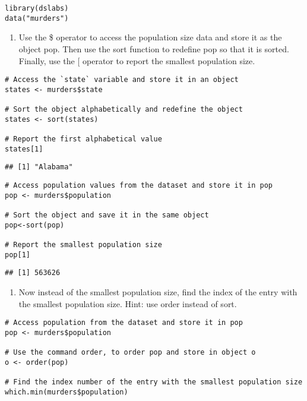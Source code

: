 \documentclass[
]{article}
\providecommand{\tightlist}{%
  \setlength{\itemsep}{0pt}\setlength{\parskip}{0pt}}
\begin{document}
\begin{verbatim}
library(dslabs)
data("murders")
\end{verbatim}

\begin{enumerate}
\def\labelenumi{\arabic{enumi}.}
\tightlist
\item
  Use the \$ operator to access the population size data and store it as
  the object pop. Then use the sort function to redefine pop so that it
  is sorted. Finally, use the {[} operator to report the smallest
  population size.
\end{enumerate}

\begin{verbatim}
# Access the `state` variable and store it in an object 
states <- murders$state 

# Sort the object alphabetically and redefine the object 
states <- sort(states) 

# Report the first alphabetical value  
states[1]
\end{verbatim}

\begin{verbatim}
## [1] "Alabama"
\end{verbatim}

\begin{verbatim}
# Access population values from the dataset and store it in pop
pop <- murders$population

# Sort the object and save it in the same object 
pop<-sort(pop)

# Report the smallest population size 
pop[1]
\end{verbatim}

\begin{verbatim}
## [1] 563626
\end{verbatim}

\begin{enumerate}
\def\labelenumi{\arabic{enumi}.}
\setcounter{enumi}{1}
\tightlist
\item
  Now instead of the smallest population size, find the index of the
  entry with the smallest population size. Hint: use order instead of
  sort.
\end{enumerate}

\begin{verbatim}
# Access population from the dataset and store it in pop
pop <- murders$population

# Use the command order, to order pop and store in object o
o <- order(pop)

# Find the index number of the entry with the smallest population size
which.min(murders$population)
\end{verbatim}
\end{document}
